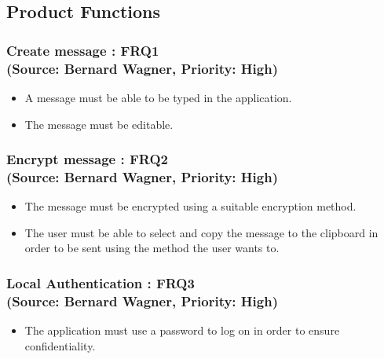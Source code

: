 \subsection{Product Functions}

\normalsize
\vspace{12pt}


\subsubsection{Create message : FRQ1\\(Source: Bernard Wagner, Priority: High)}%
\begin{itemize}
\item A message must be able to be typed in the application.
\item The message must be editable.
\end{itemize}

\subsubsection{Encrypt message : FRQ2\\(Source: Bernard Wagner, Priority: High)}
\begin{itemize}
\item The message must be encrypted using a suitable encryption method.
\item The user must be able to select and copy the message to the clipboard in order to be sent using the method the user wants to.
\end{itemize}




\subsubsection{Local Authentication : FRQ3\\(Source: Bernard Wagner, Priority: High)}%
\begin{itemize}
\item The application must use a password to log on in order to ensure confidentiality.
\end{itemize}


